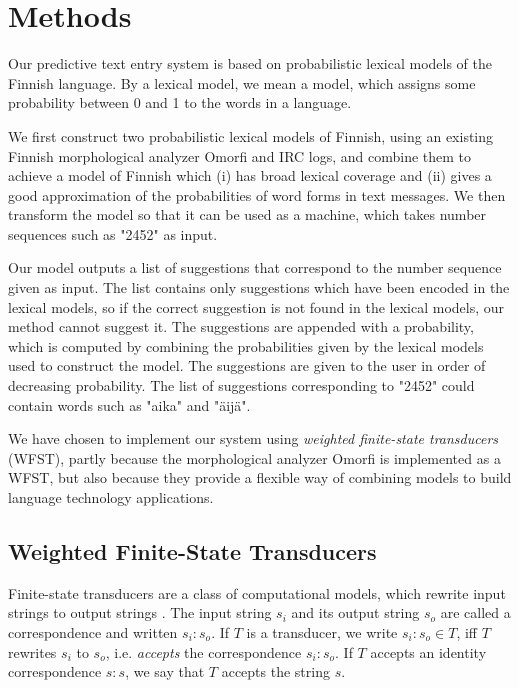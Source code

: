 \documentclass[a4paper,conference]{IEEEtran}
\begin{document}
\section{Methods}
\label{sec:methods}

Our predictive text entry system is based on probabilistic lexical
models of the Finnish language. By a lexical model, we mean a model,
which assigns some probability between 0 and 1 to the words in a
language.

We first construct two probabilistic lexical models of Finnish,
using an existing Finnish morphological analyzer Omorfi and IRC logs, and combine
them to achieve a model of Finnish which (i) has broad lexical
coverage and (ii) gives a good approximation of the probabilities of
word forms in text messages. We then transform the model so that it
can be used as a machine, which takes number sequences such as "2452"
as input.

Our model outputs a list of suggestions that correspond to the number
sequence given as input. The list contains only suggestions which
have been encoded in the lexical models, so if the correct suggestion
is not found in the lexical models, our method cannot suggest it. The
suggestions are appended with a probability, which is computed by
combining the probabilities given by the lexical models used to
construct the model. The suggestions are given to the user in order of
decreasing probability. The list of suggestions corresponding to
"2452" could contain words such as "aika" and "äijä".

We have chosen to implement our system using {\it weighted finite-state
transducers} (WFST), partly because the morphological analyzer Omorfi is
implemented as a WFST, but also because they provide a flexible way of
combining models to build language technology applications.

\subsection{Weighted Finite-State Transducers}

Finite-state transducers are a class of computational models, which
rewrite input strings to output strings \cite{beesley/2003}. The input
string $s_i$ and its output string $s_o$ are called a correspondence
and written $s_i\mathrm{:}s_o$. If $T$ is a transducer, we write
$s_i\mathrm{:}s_o \in T$, iff $T$ rewrites $s_i$ to $s_o$, i.e. {\it
  accepts} the correspondence $s_i\mathrm{:}s_o$. If $T$ accepts an
identity correspondence $s\mathrm{:}s$, we say that $T$ accepts the
string $s$.
\end{document}

